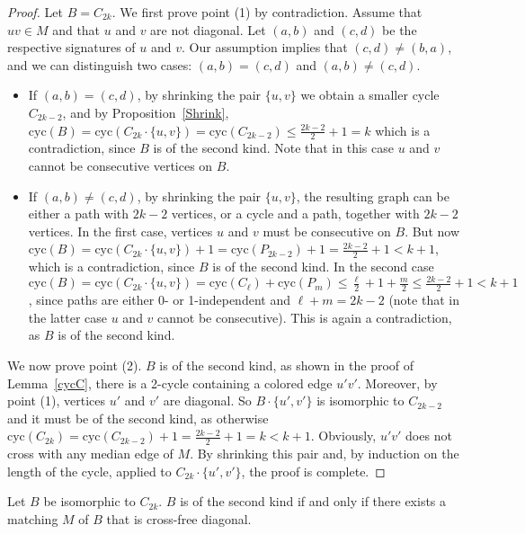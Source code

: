 \documentclass[10pt]{llncs}
\begin{document}
\begin{proof}
  Let $B = C_{2k}$.  We first prove point (1) by contradiction. Assume
  that $uv \in M$ and that $u$ and $v$ are not diagonal. Let $(a, b)$
  and $(c, d)$ be the respective signatures of $u$ and $v$. Our
  assumption implies that $(c, d) \neq (b, a)$, and we can distinguish
  two cases: $(a, b) = (c, d)$ and $(a, b) \neq (c, d)$.
  \begin{itemize}
  \item If $(a, b) = (c, d)$, by shrinking the pair $\{u, v\}$ we
    obtain a smaller cycle $C_{2k-2}$, and by Proposition~\ref{Shrink},
    $\text{cyc}(B) = \text{cyc}(C_{2k}\cdot\{u, v\}) =
    \text{cyc}(C_{2k-2}) \leq \frac{2k-2}{2} + 1 = {k} $ which
    is a contradiction, since $B$ is of the second kind. Note that in
    this case $u$ and $v$ cannot be consecutive vertices on $B$.
  \item If $(a, b) \neq (c, d)$, by shrinking the pair $\{u, v\}$, the
    resulting graph can be either a path with $2k-2$ vertices, or a
    cycle and a path, together with $2k-2$ vertices.  In the first
    case, vertices $u$ and $v$ must be consecutive on $B$. But now
    $\text{cyc}(B) = \text{cyc}(C_{2k}\cdot\{u, v\}) + 1 =
    \text{cyc}(P_{2k-2}) + 1 = \frac{2k-2}{2} + 1 < {k} + 1$, which is
    a contradiction, since $B$ is of the second kind. In the second
    case $\text{cyc}(B) = \text{cyc}(C_{2k}\cdot\{u, v\}) =
    \text{cyc}(C_\ell) + \text{cyc}(P_m) \leq \frac{\ell}{2}+1 +
    \frac{m}{2} \leq \frac{2k-2}{2} + 1 < {k} + 1$, since paths are
    either 0- or 1-independent and $\ell+m=2k-2$ (note that in the
    latter case $u$ and $v$ cannot be consecutive). This is again a
    contradiction, as $B$ is of the second kind.
  \end{itemize}

  We now prove point (2). $B$ is of the second kind, as shown in the
  proof of Lemma~\ref{cycC}, there is a 2-cycle containing a colored
  edge $u'v'$. Moreover, by point (1), vertices $u'$ and $v'$ are
  diagonal. So $B\cdot\{u', v'\}$ is isomorphic to $C_{2k-2}$ and it
  must be of the second kind, as otherwise $\text{cyc}(C_{2k}) =
  \text{cyc}(C_{2k-2}) + 1 = \frac{2k-2}{2} + 1 = {k} < {k} +
  1$. Obviously, $u'v'$ does not cross with any median edge of $M$. By
  shrinking this pair and, by induction on the length of the cycle,
  applied to $C_{2k}\cdot\{u', v'\}$, the proof is complete. \end{proof}



\begin{lemma} \label{2ndKindcyc}
  Let $B$ be isomorphic to  $C_{2k}$. $B$ is of the second kind if
  and only if there exists a matching $M$ of $B$ that is cross-free
  diagonal.
\end{lemma}
\end{document}
